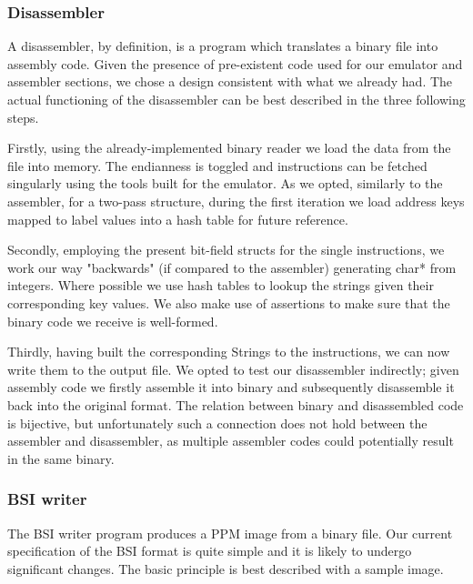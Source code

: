 \documentclass[11pt]{article}
\begin{document}
\subsubsection{Disassembler}
A disassembler, by definition, is a program which translates a binary file into assembly code. Given the presence of pre-existent code used for our emulator and assembler sections, we chose a design consistent with what we already had. The actual functioning of the disassembler can be best described in the three following steps.

Firstly, using the already-implemented binary reader we load the data from the file into memory. The endianness is toggled and instructions can be fetched singularly using the tools built for the emulator. As we opted, similarly to the assembler, for a two-pass structure, during the first iteration we load address keys mapped to label values into a hash table for future reference.

Secondly, employing the present bit-field structs for the single instructions, we work our way "backwards" (if compared to the assembler) generating char* from integers. Where possible we use hash tables to lookup the strings given their corresponding key values. We also make use of assertions to make sure that the binary code we receive is well-formed.

Thirdly, having built the corresponding Strings to the instructions, we can now write them to the output file. We opted to test our disassembler indirectly; given assembly code we firstly assemble it into binary and subsequently disassemble it back into the original format. The relation between binary and disassembled code is bijective, but unfortunately such a connection does not hold between the assembler and disassembler, as multiple assembler codes could potentially result in the same binary.

\subsubsection{BSI writer}
The BSI writer program produces a PPM image from a binary file. Our current specification of the BSI format is quite simple and it is likely to undergo significant changes. The basic principle is best described with a sample image.
\end{document}
